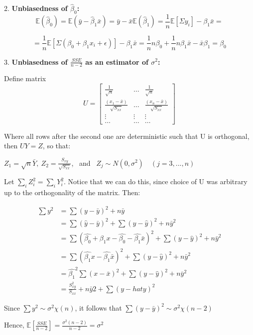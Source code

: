 \documentclass[12pt,a4paper,oneside]{book} %
\newcommand{\E}{\mathbb{E}}
\begin{document}
2. \textbf{Unbiasedness of $\hat{\beta}_0$:}
\[
\mathbb{E}(\hat{\beta}_0) = \mathbb{E}(\bar{y} - \hat{\beta}_1 \bar{x}) = \bar{y} - \bar{x} \mathbb{E}(\hat{\beta}_1) = \frac{1}{n}\mathbb{E}[\Sigma y_i]-\beta_1 \bar{x} =
\] 

\[
	= \frac{1}{n}\mathbb{E}[\Sigma (\beta_0+\beta_1x_i+\epsilon)]-\beta_1 \bar{x} 
	= \frac{1}{n}n\beta_0+\frac{1}{n}n\beta_1\bar{x}-\bar{x}\beta_1=\beta_0	
\]


3. \textbf{Unbiasedness of $\frac{SSE}{n-2}$ as an estimator of $\sigma^2$:}

Define matrix
\[
U=
\begin{bmatrix}
	\frac{1}{\sqrt{n}} & \dots & \frac{1}{\sqrt{n}} \\
	\frac{(x_1-\bar{x})}{\sqrt{S_{xx}}} & \dots & \frac{(x_n-\bar{x})}{\sqrt{S_{xx}}} \\
	\vdots & \vdots & \vdots \\
	\dots & \dots & \dots
\end{bmatrix}
\]

Where all rows after the second one are deterministic such that U is orthogonal, then $UY=Z$, so that: 

$Z_1 = \sqrt{n}\bar{Y}, \ Z_2 = \frac{S_{xy}}{ \sqrt{S_{xx} }} $, \ and \ $Z_j \sim N(0,\sigma^2) \quad (j=3,...,n)$

Let $\sum_i Z_i^2 = \sum_i Y_i^2$. Notice that we can do this, since choice of U was arbitrary up to the orthogonality of the matrix. Then:

\begin{align*}
	\sum y^2 &= \sum (y-\bar{y})^2 + n \bar{y} \\
	&= \sum (\hat{y}-\bar{y})^2 + \sum (y-\hat{y})^2+ n \bar{y}^2 \\
	&= \sum (\hat{\beta_0}+\beta_1 x-\hat{\beta_0}-\hat{\beta_1}\bar{x})^2 + \sum (y-\hat{y})^2+ n \bar{y}^2 \\
	&= \sum (\hat{\beta_1} x-\hat{\beta_1}\bar{x})^2 + \sum (y-\hat{y})^2+ n \bar{y}^2 \\
	&= \hat{\beta_1}^2 \sum ( x-\bar{x})^2 + \sum (y-\hat{y})^2+ n \bar{y}^2 \\
	&= \frac{S_{xy}^2}{S_{xx}}+n \bar{y}2 + \sum (y-hat{y})^2
\end{align*}

Since $\sum y^2 \sim \sigma^2 \chi (n)$, it follows that $\sum (y-\bar{y})^2 \sim \sigma^2 \chi (n-2) $

Hence, $\E [\frac{SSE}{n-2}]= \frac{\sigma^2 (n-2)}{n-2} = \sigma^2 $
\end{document}
